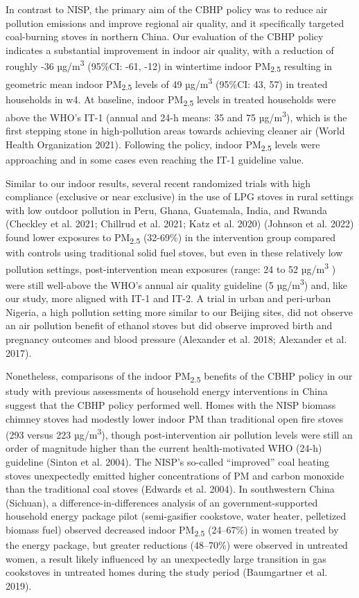 \documentclass[
  letterpaper,
  DIV=11,
  numbers=noendperiod]{scrartcl}
\begin{document}
In contrast to NISP, the primary aim of the CBHP policy was to reduce
air pollution emissions and improve regional air quality, and it
specifically targeted coal-burning stoves in northern China. Our
evaluation of the CBHP policy indicates a substantial improvement in
indoor air quality, with a reduction of roughly -36
µg/m\textsuperscript{3} (95\%CI: -61, -12) in wintertime indoor
PM\textsubscript{2.5} resulting in geometric mean indoor
PM\textsubscript{2.5} levels of 49 µg/m\textsuperscript{3} (95\%CI: 43,
57) in treated households in w4. At baseline, indoor
PM\textsubscript{2.5} levels in treated households were above the WHO's
IT-1 (annual and 24-h means: 35 and 75 µg/m\textsuperscript{3}), which
is the first stepping stone in high-pollution areas towards achieving
cleaner air (World Health Organization 2021). Following the policy,
indoor PM\textsubscript{2.5} levels were approaching and in some cases
even reaching the IT-1 guideline value.

Similar to our indoor results, several recent randomized trials with
high compliance (exclusive or near exclusive) in the use of LPG stoves
in rural settings with low outdoor pollution in Peru, Ghana, Guatemala,
India, and Rwanda (Checkley et al. 2021; Chillrud et al. 2021; Katz et
al. 2020) (Johnson et al. 2022) found lower exposures to
PM\textsubscript{2.5} (32-69\%) in the intervention group compared with
controls using traditional solid fuel stoves, but even in these
relatively low pollution settings, post-intervention mean exposures
(range: 24 to 52 µg/m\textsuperscript{3} ) were still well-above the
WHO's annual air quality guideline (5 µg/m\textsuperscript{3}) and, like
our study, more aligned with IT-1 and IT-2. A trial in urban and
peri-urban Nigeria, a high pollution setting more similar to our Beijing
sites, did not observe an air pollution benefit of ethanol stoves but
did observe improved birth and pregnancy outcomes and blood pressure
(Alexander et al. 2018; Alexander et al. 2017).

Nonetheless, comparisons of the indoor PM\textsubscript{2.5} benefits of
the CBHP policy in our study with previous assessments of household
energy interventions in China suggest that the CBHP policy performed
well. Homes with the NISP biomass chimney stoves had modestly lower
indoor PM than traditional open fire stoves (293 versus 223
µg/m\textsuperscript{3}), though post-intervention air pollution levels
were still an order of magnitude higher than the current
health-motivated WHO (24-h) guideline (Sinton et al. 2004). The NISP's
so-called ``improved'' coal heating stoves unexpectedly emitted higher
concentrations of PM and carbon monoxide than the traditional coal
stoves (Edwards et al. 2004). In southwestern China (Sichuan), a
difference-in-differences analysis of an government-supported household
energy package pilot (semi-gasifier cookstove, water heater, pelletized
biomass fuel) observed decreased indoor PM\textsubscript{2.5} (24--67\%)
in women treated by the energy package, but greater reductions
(48--70\%) were observed in untreated women, a result likely influenced
by an unexpectedly large transition in gas cookstoves in untreated homes
during the study period (Baumgartner et al. 2019).
\end{document}
